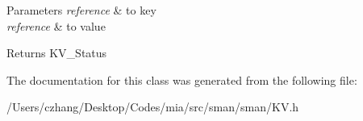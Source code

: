 \begin{DoxyParams}{Parameters}
{\em reference} & to key \\
\hline
{\em reference} & to value\\
\hline
\end{DoxyParams}
\begin{DoxyReturn}{Returns}
K\-V\-\_\-\-Status 
\end{DoxyReturn}


The documentation for this class was generated from the following file\-:\begin{DoxyCompactItemize}
\item 
/\-Users/czhang/\-Desktop/\-Codes/mia/src/sman/sman/K\-V.\-h\end{DoxyCompactItemize}
